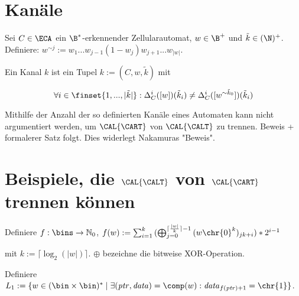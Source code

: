 
\section{Kanäle}

\begin{definition}
    Sei $C \in \ECA$ ein $\B^*$-erkennender Zellularautomat, $w \in \B^+$ und $\tilde{k} \in (\N)^+$.
    Definiere: $w^{\sim j} := w_1...w_{j-1}(1 - w_j)w_{j+1}...w_{|w|}$.
    
    Ein Kanal $k$ ist ein Tupel $k := (C, w, \tilde{k})$ mit 
    
    \[
        \forall i \in \finset{1, ..., |\tilde{k}|}: \Delta_C^i([w])(\tilde{k}_i) \neq \Delta_C^i([w ^ {\sim \tilde{k}_0 }])(\tilde{k}_i)
    \]
    
\end{definition}

\begin{satz}
    Mithilfe der Anzahl der so definierten Kanäle eines Automaten kann nicht argumentiert werden, um $\CAL{\CART}$ von $\CAL{\CALT}$ zu trennen.
    Beweis + formalerer Satz folgt. Dies widerlegt Nakamuras "Beweis".
\end{satz}






\section{Beispiele, die $\CAL{\CALT}$ von $\CAL{\CART}$ trennen können}

\begin{definition}

    Definiere $f: \bins \to \mathbb{N}_0$,
    $f(w) := \sum_{i = 1}^{k}{  ({\bigoplus_{j = 0}^{ \lceil \frac{|w|}{k} \rceil - 1}{(w \chr{0}^k)_{jk + i} } }) * 2^{i - 1}  } $
    
    mit $k := \lceil \log_2(|w|) \rceil$. $\oplus$ bezeichne die bitweise XOR-Operation.

    
    Definiere $L_1 := \{ w \in (\bin \times \bin)^* \; | \; \exists (\mathit{ptr}, \mathit{data}) = \comp(w): \mathit{data}_{f(\mathit{ptr}) + 1} = \chr{1}  \}$.
\end{definition}

